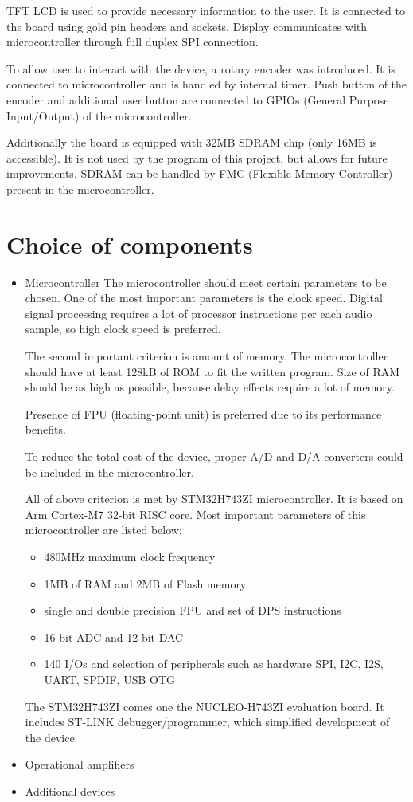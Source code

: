 \documentclass[a4paper,twoside,12pt]{book}
\begin{document}
TFT LCD is used to provide necessary information to the user.
It is connected to the board using gold pin headers and sockets.
Display communicates with microcontroller through full duplex SPI connection.

To allow user to interact with the device, a rotary encoder was introduced.
It is connected to microcontroller and is handled by internal timer.
Push button of the encoder and additional user button are connected to GPIOs (General Purpose Input/Output) of the microcontroller.

Additionally  the board is equipped with 32MB SDRAM chip (only 16MB is accessible).
It is not used by the program of this project, but allows for future improvements.
SDRAM can be handled by FMC (Flexible Memory Controller) present in the microcontroller.
\newpage

\section{Choice of components}

\begin{itemize}
    \item Microcontroller
    The microcontroller should meet certain parameters to be chosen.
    One of the most important parameters is the clock speed.
    Digital signal processing requires a lot of processor instructions per each audio sample,
    so high clock speed is preferred.

    The second important criterion is amount of memory.
    The microcontroller should have at least 128kB of ROM to fit the written program.
    Size of RAM should be as high as possible, because delay effects require a lot of memory.

    Presence of FPU (floating-point unit) is preferred due to its performance benefits.

    To reduce the total cost of the device, proper A/D and D/A converters could be included in the microcontroller.

    All of above criterion is met by STM32H743ZI microcontroller.
    It is based on Arm Cortex-M7 32-bit RISC core.
    Most important parameters of this microcontroller are listed below:
    \begin{itemize}
        \item 480MHz maximum clock frequency
        \item 1MB of RAM and 2MB of Flash memory
        \item single and double precision FPU and set of DPS instructions
        \item 16-bit ADC and 12-bit DAC
        \item 140 I/Os and selection of peripherals such as hardware SPI, I2C, I2S, UART, SPDIF, USB OTG
    \end{itemize}

    The STM32H743ZI comes one the NUCLEO-H743ZI evaluation board.
    It includes ST-LINK debugger/programmer, which simplified development of the device. 
    \item Operational amplifiers
    \item Additional devices
\end{itemize}
\end{document}

